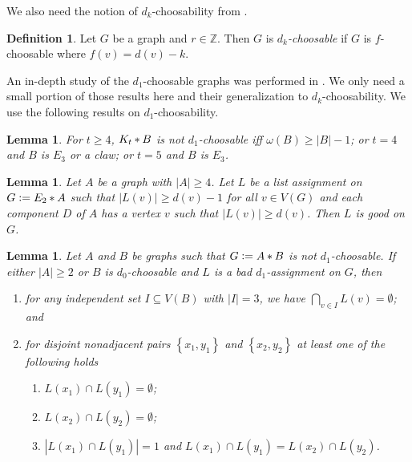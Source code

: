 \documentclass[12pt]{article}
\theoremstyle{plain}
\newtheorem{lem}[thm]{Lemma}
\theoremstyle{definition}
\newtheorem{defn}{Definition}
\theoremstyle{remark}
\newcommand{\set}[1]{\left\{ #1 \right\}}
\newcommand{\card}[1]{\left|#1\right|}
\newcommand{\join}[2]{#1 \mbox{\hspace{2 pt}$\ast$\hspace{2 pt}} #2}
\newcommand{\DefinedAs}{\mathrel{\mathop:}=}
\begin{document}
We also need the notion of $d_k$-choosability from \cite{mules}.

\begin{defn}
Let $G$ be a graph and $r \in \mathbb{Z}$.  Then $G$ is \emph{$d_k$-choosable} if $G$ is $f$-choosable where $f(v) = d(v) - k$.
\end{defn}

An in-depth study of the $d_1$-choosable graphs was performed in \cite{mules}.  We only need a small portion of those results here and their generalization to $d_k$-choosability.  We use the following results on $d_1$-choosability.

\begin{lem}\label{K_tClassification}
For $t \geq 4$, $\join{K_t}{B}$ is not $d_1$-choosable iff $\omega(B) \geq \card{B} - 1$; or $t = 4$ and $B$ is $E_3$ or a claw; or $t = 5$ and $B$ is $E_3$.
\end{lem}

\begin{lem}\label{E2JoinWithSomeLow}\label{mixed}
Let $A$ be a graph with $\card{A} \geq 4$.  Let $L$ be a list assignment on $G \DefinedAs \join{E_2}{A}$ such that $\card{L(v)} \geq d(v) - 1$ for all $v \in V(G)$ and each component $D$ of $A$ has a vertex $v$ such that $\card{L(v)} \geq d(v)$.  Then $L$ is good on $G$.
\end{lem}

\begin{lem}\label{IntersectionsInB}
Let $A$ and $B$ be graphs such that $G \DefinedAs
\join{A}{B}$ is not $d_1$-choosable.  If either $\card{A} \geq 2$ or $B$ is
$d_0$-choosable and $L$ is a bad $d_1$-assignment on $G$, then
\begin{enumerate}
\item for any independent set $I \subseteq V(B)$ with $\card{I} = 3$, we have
$\bigcap_{v \in I} L(v) = \emptyset$; and
\item for disjoint nonadjacent pairs $\set{x_1, y_1}$ and $\set{x_2, y_2}$ at least one of the following holds
	\begin{enumerate}
	\item $L(x_1) \cap L(y_1) = \emptyset$;
	\item $L(x_2) \cap L(y_2) = \emptyset$;
	\item $\card{L(x_1) \cap L(y_1)} = 1$ and $L(x_1) \cap L(y_1) = L(x_2) \cap L(y_2)$.
	\end{enumerate}
\end{enumerate}
\end{lem}
\end{document}
